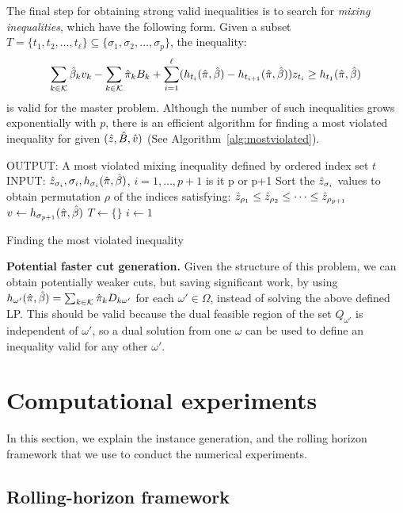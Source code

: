 \documentclass[10pt]{article}
\newcommand{\ti}{t} %
\newcommand{\ka}{k} %
\newcommand{\KA}{\mathcal{K}}
\newcommand{\Bi}{B} %
\newcommand{\Vi}{v} %
\newcommand{\Zed}{z} %
\newcommand{\m}{\omega} %
\newcommand{\EM}{\Omega} %
\newcommand{\cred}{\color{red!65!black}}
\begin{document}
The final step for obtaining strong valid inequalities is to search for {\it mixing inequalities}, which have the following form. Given a subset $T = \{t_1,t_2,\ldots,t_{\ell}\} \subseteq \{\sigma_1,\sigma_2,\ldots,\sigma_p\}$, the inequality:
\[  \sum_{\ka  \in \KA} \betasol_k \Vi_k - \sum_{\ka  \in \KA} \pisol_k \Bi_k + 
\sum_{i=1}^{\ell} (h_{t_i}(\pisol,\betasol) - h_{t_{i+1}}(\pisol,\betasol))\Zed_{t_i}
\geq  h_{t_1}(\pisol,\betasol) \]
is valid for the master problem. Although the number of such inequalities grows exponentially with $p$, there is an efficient algorithm for finding a most violated inequality for given $(\zsol,\bsol,\vsol)$ (See Algorithm~\ref{alg:mostviolated}). 

\begin{algorithm}[H]
\label{alg:mostviolated}
\SetAlgoLined
{OUTPUT: A most violated mixing inequality defined by ordered index set $\ti$ } \;
INPUT: $\zsol_{\sigma_i}, \sigma_i, h_{\sigma_i}(\pisol,\betasol)$, $i=1,\ldots,p+1$  {\cred is it p or p+1}\;
Sort the $\zsol_{\sigma_i}$ values to obtain permutation $\rho$ of the indices satisfying:
$\zsol_{\rho_1} \leq \zsol_{\rho_2} \leq \cdots \leq \zsol_{\rho_{p+1}} $ \;
$v \gets h_{\sigma_{p+1}}(\hat{\pi},\hat{\beta})$\;
$T \gets \{ \}$\;
$ i \gets 1$\;
\caption{Finding the most violated inequality}
\end{algorithm}

{\bf Potential faster cut generation.} Given the structure of this problem,  we can obtain potentially weaker cuts, but saving significant work, by using $h_{\m'}(\pisol,\betasol) = \sum_{\ka  \in \KA} \pisol_\ka D_{\ka \m'}$ for each $\m' \in \EM$, instead of solving the above defined LP. This should be valid because the dual feasible region of the set $Q_{\m'}$ is independent of $\m'$, so a dual solution from one $\m$ can be used to define an inequality valid for any other $\m'$.



  

\section{Computational experiments}
In this section, we explain the instance generation, and the rolling horizon framework that we use to conduct the numerical experiments. 
\subsection{Rolling-horizon framework}
\label{Sec:Rolling}
\end{document}
